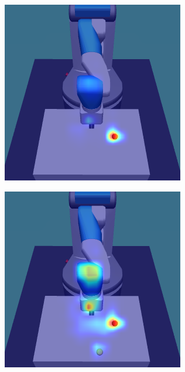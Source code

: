 \begin{figure}
  \centering
  \begin{subfigure}{0.24\columnwidth}
    \includegraphics[width=\linewidth]{figures/chapter6/distractor_saliency_fetch_pro_off/standard_visual_std}
  \end{subfigure}
  \begin{subfigure}{0.24\columnwidth}
    \includegraphics[width=\linewidth]{figures/chapter6/distractor_saliency_fetch_pro_off/color_visual_std}

\end{subfigure}
\end{figure}

